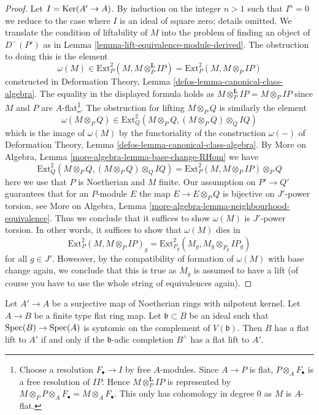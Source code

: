 \begin{proof}
Let $I = \mathop{\mathrm{Ker}}(A' \to A)$. By induction on the integer $n > 1$
such that $I^n = 0$ we reduce to the case where $I$ is an ideal
of square zero; details omitted.
We translate the condition of liftability of
$M$ into the problem of finding an object of $D^-(P')$ as in
Lemma \ref{lemma-lift-equivalence-module-derived}.
The obstruction to doing this is the element
$$
\omega(M) \in \text{Ext}^2_P(M, M \otimes_P^\mathbf{L} IP) =
\text{Ext}^2_P(M, M \otimes_P IP)
$$
constructed in
Deformation Theory, Lemma \ref{defos-lemma-canonical-class-algebra}.
The equality in the displayed formula holds as
$M \otimes_P^\mathbf{L} IP = M \otimes_P IP$
since $M$ and $P$ are $A$-flat\footnote{Choose a resolution
$F_\bullet \to I$ by free $A$-modules. Since $A \to P$ is flat,
$P \otimes_A F_\bullet$ is a free resolution of $IP$.
Hence $M \otimes_P^\mathbf{L} IP$ is represented by
$M \otimes_P P \otimes_A F_\bullet = M \otimes_A F_\bullet$.
This only has cohomology in degree $0$ as $M$ is $A$-flat.}.
The obstruction for lifting $M \otimes_P Q$ is similarly
the element
$$
\omega(M \otimes_P Q) \in
\text{Ext}^2_Q(M \otimes_P Q, (M \otimes_P Q) \otimes_Q IQ)
$$
which is the image of $\omega(M)$ by the functoriality
of the construction $\omega(-)$ of
Deformation Theory, Lemma \ref{defos-lemma-canonical-class-algebra}.
By More on Algebra, Lemma \ref{more-algebra-lemma-base-change-RHom}
we have
$$
\text{Ext}^2_Q(M \otimes_P Q, (M \otimes_P Q) \otimes_Q IQ) =
\text{Ext}^2_P(M, M \otimes_P IP) \otimes_P Q
$$
here we use that $P$ is Noetherian and $M$ finite.
Our assumption on $P' \to Q'$ guarantees that for an $P$-module $E$
the map $E \to E \otimes_P Q$ is bijective on $J'$-power torsion, see
More on Algebra, Lemma
\ref{more-algebra-lemma-neighbourhood-equivalence}.
Thus we conclude that it suffices to show $\omega(M)$
is $J'$-power torsion. In other words, it suffices to show that
$\omega(M)$ dies in
$$
\text{Ext}^2_P(M, M \otimes_P IP)_g =
\text{Ext}^2_{P_g}(M_g, M_g \otimes_{P_g} IP_g)
$$
for all $g \in J'$. Howeover, by the compatibility of formation of $\omega(M)$
with base change again, we conclude that this is true as $M_g$
is assumed to have a lift (of course you have to use the whole
string of equivalences again).
\end{proof}

\begin{lemma}
\label{lemma-lift-equivalence}
Let $A' \to A$ be a surjective map of Noetherian rings with nilpotent kernel.
Let $A \to B$ be a finite type flat ring map.
Let $\mathfrak b \subset B$ be an ideal such that
$\mathop{\mathrm{Spec}}(B) \to \mathop{\mathrm{Spec}}(A)$ is syntomic on the complement of $V(\mathfrak b)$.
Then $B$ has a flat lift to $A'$ if and only if the $\mathfrak b$-adic
completion $B^\wedge$ has a flat lift to $A'$.
\end{lemma}

